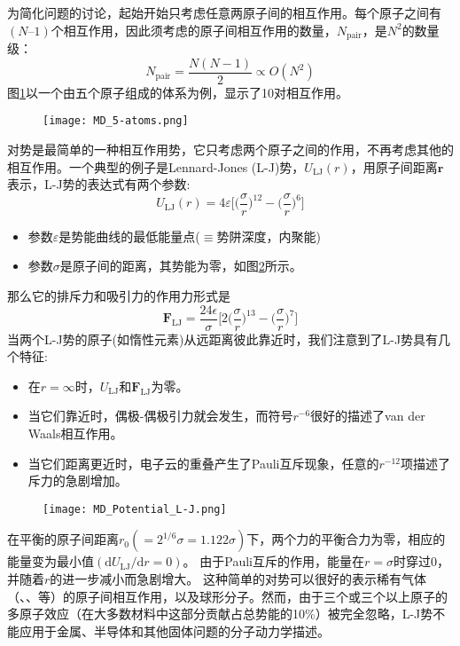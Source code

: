 为简化问题的讨论，起始开始只考虑任意两原子间的相互作用。每个原子之间有$(N–1)$个相互作用，因此须考虑的原子间相互作用的数量，$N_{\mathrm{pair}}$，是$N^2$的数量级：
\begin{equation}
	N_{\mathrm{pair}}=\dfrac{N(N-1)}2\propto O(N^2)
	\label{eq:interaction_atom_range}
\end{equation}
图\ref{MD_5-atoms}以一个由五个原子组成的体系为例，显示了10对相互作用。
\begin{figure}[h!]
\centering
\vspace*{-0.1in}
\texttt{[image: MD\_5-atoms.png]}
\caption{\fontsize{7.2pt}{4.2pt}\selectfont{五原子体系中的成对相互作用(箭头标示).}}%
\label{MD_5-atoms}
\end{figure}

对势是最简单的一种相互作用势，它只考虑两个原子之间的作用，不再考虑其他的相互作用。一个典型的例子是\textrm{Lennard-Jones (L-J)}势\cite{PRSC106-463_1924}，$U_{\mathrm{LJ}}(r)$，用原子间距离$\mathbf{r}$表示，\textrm{L-J}势的表达式有两个参数:~
\begin{equation}
	U_{\mathrm{LJ}}(r)=4\varepsilon\bigg[\bigg(\dfrac{\sigma}r\bigg)^{12}-\bigg(\dfrac{\sigma}r\bigg)^6\bigg]
	\label{eq:Potential_L-J}
\end{equation}
\begin{itemize}
	\item 参数$\varepsilon$是势能曲线的最低能量点($\equiv$势阱深度，内聚能)
	\item 参数$\sigma$是原子间的距离，其势能为零，如图\ref{Curve_L-J}所示。
\end{itemize}
那么它的排斥力和吸引力的作用力形式是
\begin{equation}
	\mathbf{F}_{\mathrm{LJ}}=\dfrac{24\epsilon}{\sigma}\bigg[2\bigg(\dfrac{\sigma}r\bigg)^{13}-\bigg(\dfrac{\sigma}r\bigg)^7\bigg]
	\label{eq:Focrce_L-J}
\end{equation}
当两个\textrm{L-J}势的原子(如惰性元素)从远距离彼此靠近时，我们注意到了\textrm{L-J}势具有几个特征:~
\begin{itemize}
	\item 在$r=\infty$时，$U_{\mathrm{LJ}}$和$\mathbf{F_{\mathrm{LJ}}}$为零。
	\item 当它们靠近时，偶极-偶极引力就会发生，而符号$r^{-6}$很好的描述了\textrm{van der Waals}相互作用。
	\item 当它们距离更近时，电子云的重叠产生了\textrm{Pauli}互斥现象，任意的$r^{-12}$项描述了斥力的急剧增加。
\end{itemize}
\begin{figure}[h!]
\centering
\vspace*{-0.1in}
\texttt{[image: MD\_Potential\_L-J.png]}
\caption{\fontsize{7.2pt}{4.2pt}}%
\label{Curve_L-J}
\end{figure}
在平衡的原子间距离$r_0(=2^{1/6}\sigma=1.122\sigma)$下，两个力的平衡合力为零，相应的能量变为最小值$(\mathrm{d}U_{\mathrm{LJ}}/\mathrm{d}r=0)$。
由于\textrm{Pauli}互斥的作用，能量在$r=\sigma$时穿过0，并随着$r$的进一步减小而急剧增大。
这种简单的对势可以很好的表示稀有气体（、、等）的原子间相互作用，以及球形分子。然而，由于三个或三个以上原子的多原子效应（在大多数材料中这部分贡献占总势能的10\%）被完全忽略，\textrm{L-J}势不能应用于金属、半导体和其他固体问题的分子动力学描述。
